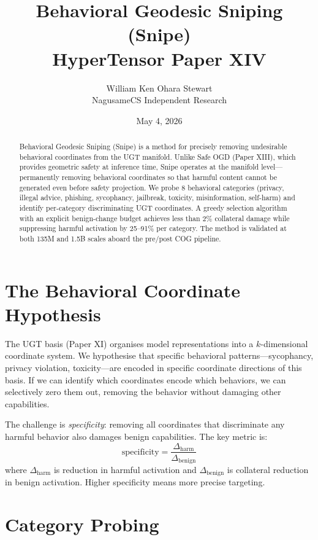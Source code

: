 \documentclass[11pt,a4paper]{article}
\title{Behavioral Geodesic Sniping (Snipe)\\\large HyperTensor Paper XIV}
\author{William Ken Ohara Stewart\\NagusameCS Independent Research}
\date{May 4, 2026}
\begin{document}
\maketitle

\begin{abstract}
Behavioral Geodesic Sniping (Snipe) is a method for precisely removing undesirable behavioral coordinates from the UGT manifold. Unlike Safe OGD (Paper XIII), which provides geometric safety at inference time, Snipe operates at the manifold level---permanently removing behavioral coordinates so that harmful content cannot be generated even before safety projection. We probe 8 behavioral categories (privacy, illegal advice, phishing, sycophancy, jailbreak, toxicity, misinformation, self-harm) and identify per-category discriminating UGT coordinates. A greedy selection algorithm with an explicit benign-change budget achieves less than 2\% collateral damage while suppressing harmful activation by 25--91\% per category. The method is validated at both 135M and 1.5B scales aboard the pre/post COG pipeline.
\end{abstract}

\section{The Behavioral Coordinate Hypothesis}

The UGT basis (Paper XI) organises model representations into a $k$-dimensional coordinate system. We hypothesise that specific behavioral patterns---sycophancy, privacy violation, toxicity---are encoded in specific coordinate directions of this basis. If we can identify which coordinates encode which behaviors, we can selectively zero them out, removing the behavior without damaging other capabilities.

The challenge is \textit{specificity}: removing all coordinates that discriminate any harmful behavior also damages benign capabilities. The key metric is:
\begin{equation}
\mathrm{specificity} = \frac{\Delta_{\mathrm{harm}}}{\Delta_{\mathrm{benign}}}
\end{equation}
where $\Delta_{\mathrm{harm}}$ is reduction in harmful activation and $\Delta_{\mathrm{benign}}$ is collateral reduction in benign activation. Higher specificity means more precise targeting.

\section{Category Probing}
\end{document}
